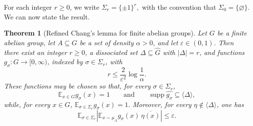 \documentclass[11pt,reqno]{amsart}
\theoremstyle{plain}
\newtheorem{thm}{Theorem}[section]
\theoremstyle{remark}
\begin{document}
For each integer $r\ge 0$, we write
$
\Sigma_r=\{\pm1\}^r,
$
with the convention that $\Sigma_0=\{\varnothing\}$. We can now state the
result.
\begin{thm}[Refined Chang's lemma for finite abelian groups]
\label{thm:refined-chang-general}
Let $G$ be a finite abelian group, let $A\subseteq G$ be a set of density
$\alpha>0$, and let $\varepsilon\in(0,1)$. Then there exist an integer
$r\ge 0$, a dissociated set $\Delta\subseteq \widehat G$ with $|\Delta|=r$,
and functions $g_\sigma:G\to[0,\infty)$, indexed by $\sigma\in\Sigma_r$,
with
$$
r\le \frac{2}{\varepsilon^2}\log\frac1\alpha.
$$
These functions may be chosen so that, for every $\sigma\in\Sigma_r$,
$$
\mathbb E_{x\in G} g_\sigma(x)=1
\qquad\text{and}\qquad
\operatorname{supp}\widehat{g_\sigma}\subseteq \langle\Delta\rangle,
$$
while, for every $x\in G$,
$
\mathbb E_{\sigma\in\Sigma_r} g_\sigma(x)=1.
$
Moreover, for every $\eta\notin\langle\Delta\rangle$, one has
$$
\mathbb E_{\sigma\in\Sigma_r}
\left|
\mathbb E_{x\sim\mu_A} g_\sigma(x)\,\overline{\eta(x)}
\right|
\le \varepsilon.
$$
\end{thm}
\end{document}
